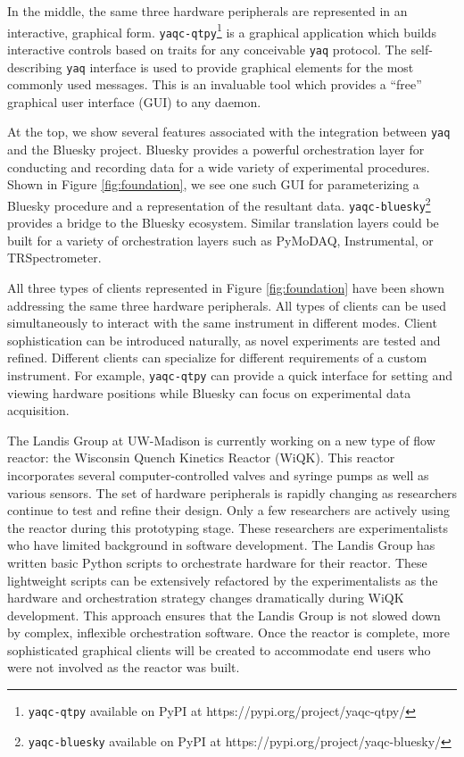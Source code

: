 \documentclass[aip, amsmath, amssymb, reprint,]{revtex4-2}
\newcommand\yaq{\texttt{yaq}}
\begin{document}
In the middle, the same three hardware peripherals are represented in an interactive, graphical form.
\texttt{yaqc-qtpy}\footnote{\texttt{yaqc-qtpy} available on PyPI at https://pypi.org/project/yaqc-qtpy/} is a graphical application which builds interactive controls based on traits for any conceivable \yaq{} protocol.
The self-describing \yaq{} interface is used to provide graphical elements for the most commonly used messages.
This is an invaluable tool which provides a ``free'' graphical user interface (GUI) to any daemon.

At the top, we show several features associated with the integration between \yaq{} and the Bluesky project\cite{AllanDanielB2019a}.
Bluesky provides a powerful orchestration layer for conducting and recording data for a wide variety of experimental procedures.
Shown in Figure \ref{fig:foundation}, we see one such GUI for parameterizing a Bluesky procedure and a representation of the resultant data.
\texttt{yaqc-bluesky}\footnote{\texttt{yaqc-bluesky} available on PyPI at https://pypi.org/project/yaqc-bluesky/} provides a bridge to the Bluesky ecosystem.
Similar translation layers could be built for a variety of orchestration layers such as PyMoDAQ\cite{WeberSebastien2021a}, Instrumental\cite{Bogdanowicz2022}, or TRSpectrometer\cite{trspectrometer}.

All three types of clients represented in Figure \ref{fig:foundation} have been shown addressing the same three hardware peripherals.
All types of clients can be used simultaneously to interact with the same instrument in different modes.
Client sophistication can be introduced naturally, as novel experiments are tested and refined.
Different clients can specialize for different requirements of a custom instrument.
For example, \texttt{yaqc-qtpy} can provide a quick interface for setting and viewing hardware positions while Bluesky can focus on experimental data acquisition.

The Landis Group at UW-Madison is currently working on a new type of flow reactor: the Wisconsin Quench Kinetics Reactor (WiQK).
This reactor incorporates several computer-controlled valves and syringe pumps as well as various sensors.
The set of hardware peripherals is rapidly changing as researchers continue to test and refine their design.
Only a few researchers are actively using the reactor during this prototyping stage.
These researchers are experimentalists who have limited background in software development.
The Landis Group has written basic Python scripts to orchestrate hardware for their reactor.
These lightweight scripts can be extensively refactored by the experimentalists as the hardware and orchestration strategy changes dramatically during WiQK development.
This approach ensures that the Landis Group is not slowed down by complex, inflexible orchestration software.
Once the reactor is complete, more sophisticated graphical clients will be created to accommodate end users who were not involved as the reactor was built.
\end{document}
